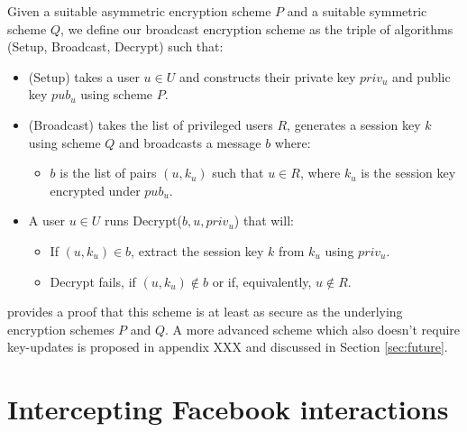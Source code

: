 \begin{defn}
    
    Given a suitable asymmetric encryption scheme $P$ and a suitable symmetric scheme $Q$, we define our broadcast encryption scheme as the triple of algorithms {\sc (Setup, Broadcast, Decrypt)} such that:
    
    \begin{itemize}
    
    \item {\sc (Setup)} takes a user $u \in U$ and constructs their private key $priv_u$ and public key $pub_u$ using scheme $P$.
    
    \item {\sc (Broadcast)} takes the list of privileged users $R$, generates a session key $k$ using scheme $Q$ and broadcasts a message $b$ where:
    
    \begin{itemize}
        \item $b$ is the list of pairs $(u,k_u)$ such that $u \in R$, where $k_u$ is the session key encrypted under $pub_u$.
    \end{itemize}
    
    
    \item A user $u \in U$ runs {\sc Decrypt($b, u, priv_u$)} that will:
    
        \begin{itemize}
            \item If $(u,k_u) \in b$, extract the session key $k$ from $k_u$ using $priv_u$.
        
            \item {\sc Decrypt} fails, if $(u,k_u) \notin b$ or if, equivalently, $u \notin R$.
        
        \end{itemize}

    \end{itemize}
    
\end{defn}    

\cite{survey} provides a proof that this scheme is at least as secure as the underlying encryption schemes $P$ and $Q$. A more advanced scheme which also doesn't require key-updates is proposed in appendix XXX and discussed in Section \ref{sec:future}.


\FloatBarrier
\section{Intercepting Facebook interactions}

